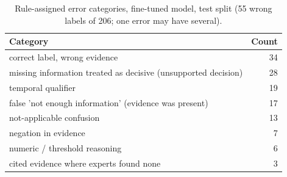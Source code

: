 \begin{table}[t]
\centering
\footnotesize
\caption{Rule-assigned error categories, fine-tuned model, test split (55 wrong labels of 206; one error may have several).}
\label{tab:errors}
\begin{tabular}{lr}
\toprule
Category & Count \\
\midrule
correct label, wrong evidence & 34 \\
missing information treated as decisive (unsupported decision) & 28 \\
temporal qualifier & 19 \\
false 'not enough information' (evidence was present) & 17 \\
not-applicable confusion & 13 \\
negation in evidence & 7 \\
numeric / threshold reasoning & 6 \\
cited evidence where experts found none & 3 \\
\bottomrule
\end{tabular}
\end{table}
